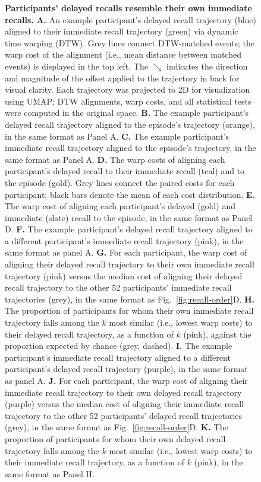\documentclass[10pt]{article}
\begin{document}
\begin{figure}[t]
    \ContinuedFloat
    \caption{\small \textbf{Participants' delayed recalls resemble their own immediate recalls.}
    \textbf{A.} An example participant's delayed recall trajectory (blue) aligned to their immediate recall trajectory (green) via dynamic time warping (DTW). 
    Grey lines connect DTW-matched events; the warp cost of the alignment (i.e., mean distance between matched events) is displayed in the top left.
    The $\searrow$ indicates the direction and magnitude of the offset applied to the trajectory in back for visual clarity.
    Each trajectory was projected to 2D for visualization using UMAP; DTW alignments, warp costs, and all statistical tests were computed in the original space.
    \textbf{B.} The example participant's delayed recall trajectory aligned to the episode's trajectory (orange), in the same format as Panel A.
    \textbf{C.} The example participant's immediate recall trajectory aligned to the episode's trajectory, in the same format as Panel A.
    \textbf{D.} The warp costs of aligning each participant's delayed recall to their immediate recall (teal) and to the episode (gold).
    Grey lines connect the paired costs for each participant; black bars denote the mean of each cost distribution.
    \textbf{E.} The warp cost of aligning each participant's delayed (gold) and immediate (slate) recall to the episode, in the same format as Panel D.
    \textbf{F.} The example participant's delayed recall trajectory aligned to a different participant's immediate recall trajectory (pink), in the same format as panel A.
    \textbf{G.} For each participant, the warp cost of aligning their delayed recall trajectory to their own immediate recall trajectory (pink) versus the median cost of aligning their delayed recall trajectory to the other 52 participants' immediate recall trajectories (grey), in the same format as Fig.~\ref{fig:recall-order}D.
    \textbf{H.} The proportion of participants for whom their own immediate recall trajectory falls among the $k$ most similar (i.e., lowest warp costs) to their delayed recall trajectory, as a function of $k$ (pink), against the proportion expected by chance (grey, dashed).
    \textbf{I.} The example participant's immediate recall trajectory aligned to a different participant's delayed recall trajectory (purple), in the same format as panel A.
    \textbf{J.} For each participant, the warp cost of aligning their immediate recall trajectory to their own delayed recall trajectory (purple) versus the median cost of aligning their immediate recall trajectory to the other 52 participants' delayed recall trajectories (grey), in the same format as Fig.~\ref{fig:recall-order}D.
    \textbf{K.} The proportion of participants for whom their own delayed recall trajectory falls among the $k$ most similar (i.e., lowest warp costs) to their immediate recall trajectory, as a function of $k$ (pink), in the same format as Panel H.}
    
\end{figure}
\end{document}
